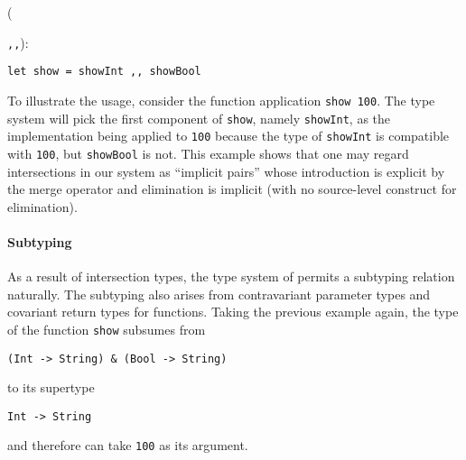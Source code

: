 ({\lstinline{,,}):
\begin{lstlisting}
let show = showInt ,, showBool
\end{lstlisting}

To illustrate the usage, consider the function application \lstinline{show 100}.
The type system will pick the first component of \lstinline{show}, namely
\lstinline{showInt}, as the implementation being applied to \lstinline{100}
because the type of \lstinline{showInt} is compatible with \lstinline{100}, but
\lstinline{showBool} is not. This example shows that one may regard
intersections in our system as ``implicit pairs'' whose introduction is explicit
by the merge operator and elimination is implicit (with no source-level
construct for elimination).








\paragraph{Subtyping}


As a result of intersection types, the type system of \name permits a subtyping
relation naturally. The subtyping also arises from contravariant parameter types
and covariant return types for functions. Taking the previous example again, the
type of the function \lstinline{show} subsumes from
\begin{lstlisting}
(Int -> String) & (Bool -> String)
\end{lstlisting}
to its supertype
\begin{lstlisting}
Int -> String
\end{lstlisting}
and therefore can take \lstinline{100} as its argument.

}
